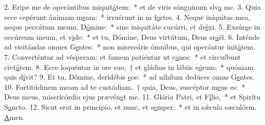 2. Eripe me de operántibus iniquit\uline{á}tem:~* et de viris sánguinum slv\uline{a} me.
3. Quia ecce cepérunt ánimam m\uline{e}am:~* irruérunt in m f\uline{o}rtes.
4. Neque iníquitas mea, neque peccátum meum, D\uline{ó}mine:~* sine iniquitáte cucúrri, et dr\uline{é}xi.
5. Exsúrge in occúrsum meum, et v\uline{i}de:~* et tu, Dómine, Deus virtútum, Deus sr\uline{a}ël.
6. Inténde ad visitándas omnes G\uline{e}ntes:~* non misereáris ómnibus, qui operántur init\uline{á}tem.
7. Converténtur ad vésperam: et famem patiéntur ut c\uline{a}nes:~* et circuíbunt civt\uline{á}tem.
8. Ecce loquéntur in ore suo,~† et gládius in lábiis e\uline{ó}rum:~* quóniam quis d\uline{í}vit?
9. Et tu, Dómine, deridébis \uline{e}os:~* ad níhilum dedúces omns G\uline{e}ntes.
10. Fortitúdinem meam ad te custódiam,~† quia, Deus, suscéptor m\uline{e}us es:~* Deus meus, misericórdia ejus prævén\uline{e}t me.
11. Glória Patri, et F\uline{í}lio,~* et Spirítu S\uline{a}ncto.
12. Sicut erat in princípio, et nunc, et s\uline{e}mper,~* et in sǽcula sæculórm. \uline{A}men.
